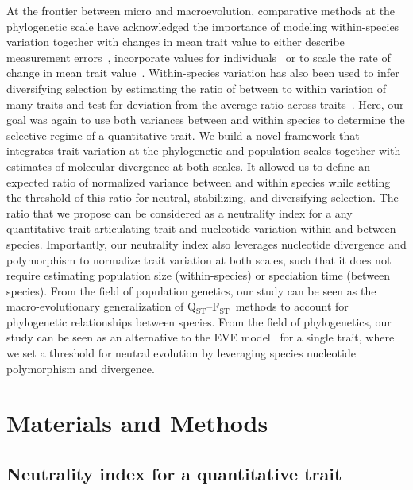 \documentclass{article}
\newcommand{\Qst}{Q$_\text{ST}$}
\newcommand{\Fst}{F$_\text{ST}$}
\newcommand{\QstFst}{\Qst--\Fst}
\begin{document}
At the frontier between micro and macroevolution, comparative methods at the phylogenetic scale have acknowledged the importance of modeling within-species variation together with changes in mean trait value to either describe measurement errors~\parencite{lynch_methods_1991, hansen_interpreting_2012}, incorporate values for individuals~\parencite{felsenstein_comparative_2008} or to scale the rate of change in mean trait value~\parencite{kostikova_bridging_2016, gaboriau_multiplatform_2020, gaboriau_exploring_2023}.
Within-species variation has also been used to infer diversifying selection by estimating the ratio of between to within variation of many traits and test for deviation from the average ratio across traits~\parencite{rohlfs_modeling_2014, rohlfs_phylogenetic_2015}.
Here, our goal was again to use both variances between and within species to determine the selective regime of a quantitative trait.
We build a novel framework that integrates trait variation at the phylogenetic and population scales together with estimates of molecular divergence at both scales.
It allowed us to define an expected ratio of normalized variance between and within species while setting the threshold of this ratio for neutral, stabilizing, and diversifying selection.
The ratio that we propose can be considered as a neutrality index for a any quantitative trait articulating trait and nucleotide variation within and between species.
Importantly, our neutrality index also leverages nucleotide divergence and polymorphism to normalize trait variation at both scales, such that it does not require estimating population size (within-species) or speciation time (between species).
From the field of population genetics, our study can be seen as the macro-evolutionary generalization of \QstFst\ methods to account for phylogenetic relationships between species.
From the field of phylogenetics, our study can be seen as an alternative to the EVE model~\parencite{rohlfs_modeling_2014, rohlfs_phylogenetic_2015} for a single trait, where we set a threshold for neutral evolution by leveraging species nucleotide polymorphism and divergence.


\section*{Materials and Methods}\label{sec:materials-and-methods}
\subsection*{Neutrality index for a quantitative trait}\label{subsec:neutrality-index-for-a-quantitative-trait}
\end{document}
